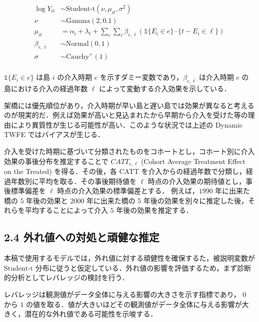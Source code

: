 \[
\begin{aligned}
\log{Y_{it}} &\sim \text{Student-t} (\nu, \mu_{it}, \sigma^2) \\
\nu &\sim \text{Gamma}(2, 0.1) \\
\mu_{it} &= \alpha_i + \lambda_t + \sum_{e} \sum_{\ell} \beta_{e, \ell} (\mathbb{1}\{E_i \in e\} \cdot \{t - E_i \in \ell\}) \\
\beta_{e, \ell} &\sim \text{Normal}(0, 1) \\
\sigma &\sim \text{Cauchy}^+(1) \\
\end{aligned}
\]

\(\mathbb{1}\{E_i \in e\}\) は島 \(i\) の介入時期 \(e\)
を示すダミー変数であり，\(\beta_{e, \ell}\) は介入時期 \(e\)
の島における介入の経過年数 \(\ell\)
によって変動する介入効果を示している．

架橋には優先順位があり，介入時期が早い島と遅い島では効果が異なると考えるのが現実的だ．例えば効果が高いと見込まれたから早期から介入を受けた等の理由により異質性が生じる可能性が高い．このような状況では上述の
Dynamic TWFE ではバイアスが生じる．

介入を受けた時期に基づいて分類されたものをコホートとし，コホート別に介入効果の事後分布を推定することで
\(CATT_{e,\ell}\) (Cohort Average Treatment Effect on the Treated)
を得る．その後，各 CATT
を介入からの経過年数で分類し，経過年数別に平均を取る．その事後期待値を
\(\ell\) 時点の介入効果の期待値とし，事後標準偏差を \(\ell\)
時点の介入効果の標準偏差とする． 例えば，\(1990\) 年に出来た橋の \(5\)
年後の効果と \(2000\) 年に出来た橋の \(5\)
年後の効果を別々に推定した後，それらを平均することによって介入 \(5\)
年後の効果を推定する．

\hypertarget{ux5916ux308cux5024ux3078ux306eux5bfeux51e6ux3068ux9811ux5065ux306aux63a8ux5b9a}{%
\subsection{2.4
外れ値への対処と頑健な推定}\label{ux5916ux308cux5024ux3078ux306eux5bfeux51e6ux3068ux9811ux5065ux306aux63a8ux5b9a}}

本稿で使用するモデルでは，外れ値に対する頑健性を確保するた，被説明変数が
\(\text{Student-t}\)
分布に従うと仮定している．外れ値の影響を評価するため，まず診断的分析としてレバレッジの検討を行う．

レバレッジは観測値がデータ全体に与える影響の大きさを示す指標であり，
\(0\) から \(1\)
の値を取る．値が大きいほどその観測値がデータ全体に与える影響が大きく，潜在的な外れ値である可能性を示唆する．

